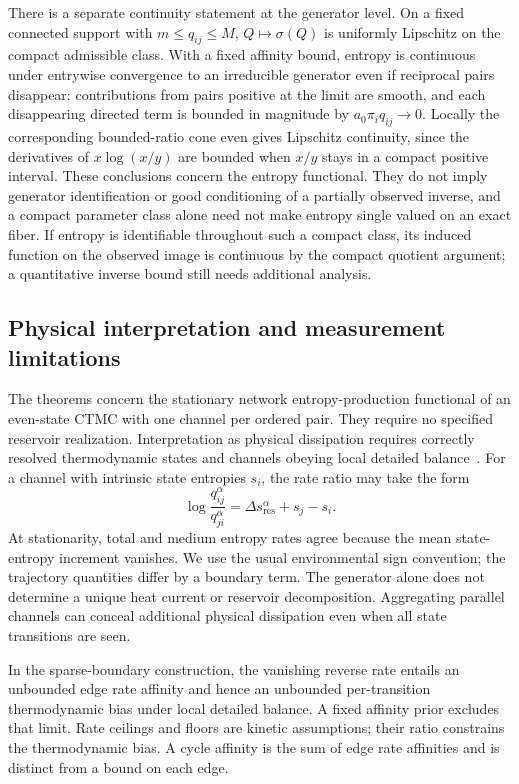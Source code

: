 \documentclass[aps,pre,onecolumn,11pt,longbibliography,notitlepage]{revtex4-2}
\newcommand{\1}{\mathbf 1}
\newcommand{\sig}{\sigma}
\begin{document}
There is a separate continuity statement at the generator level. On a
fixed connected support with $m\le q_{ij}\le M$, $Q\mapsto\sig(Q)$ is
uniformly Lipschitz on the compact admissible class. With a fixed
affinity bound, entropy is continuous under entrywise convergence to an
irreducible generator even if reciprocal pairs disappear: contributions
from pairs positive at the limit are smooth, and each disappearing
directed term is bounded in magnitude by $a_0\pi_iq_{ij}\to0$.
Locally the corresponding bounded-ratio cone even gives Lipschitz
continuity, since the derivatives of $x\log(x/y)$ are bounded when
$x/y$ stays in a compact positive interval. These conclusions concern
the entropy functional. They do not imply generator identification or
good conditioning of a partially observed inverse, and a compact
parameter class alone need not make entropy single valued on an exact
fiber. If entropy is identifiable throughout such a compact class, its
induced function on the observed image is continuous by the compact
quotient argument; a quantitative inverse bound still needs additional
analysis.

\subsection{Physical interpretation and measurement limitations}
The theorems concern the stationary network entropy-production
functional of an even-state CTMC with one channel per ordered pair.
They require no specified reservoir realization. Interpretation as
physical dissipation requires correctly resolved thermodynamic states
and channels obeying local detailed balance~\cite{Esposito2012}.
For a channel with intrinsic state entropies $s_i$, the rate ratio may
take the form
\begin{equation}
 \log\frac{q_{ij}^{\alpha}}{q_{ji}^{\alpha}}
 =\Delta s_{\mathrm{res}}^{\alpha}+s_j-s_i.
\end{equation}
At stationarity, total and medium entropy rates agree because the mean
state-entropy increment vanishes. We use the usual environmental sign
convention; the trajectory quantities differ by a boundary term.
The generator alone does not determine a unique heat current or
reservoir decomposition. Aggregating parallel channels can conceal
additional physical dissipation even when all state transitions are seen.

In the sparse-boundary construction, the vanishing reverse rate entails
an unbounded edge rate affinity and hence an unbounded per-transition
thermodynamic bias under local detailed balance. A fixed affinity prior
excludes that limit. Rate ceilings and floors are kinetic assumptions;
their ratio constrains the thermodynamic bias. A cycle affinity is the
sum of edge rate affinities and is distinct from a bound on each edge.
\end{document}
